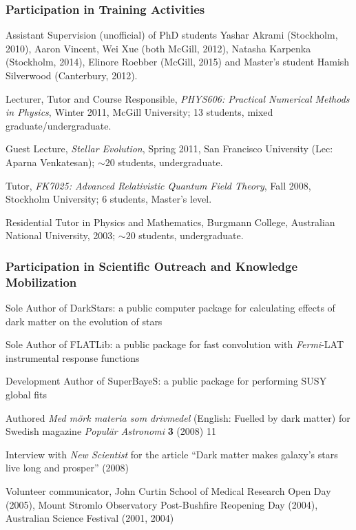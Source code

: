 \documentclass[10pt,oneside,twocolumn,a4paper]{article}
\newenvironment{packed_itemize}{
\begin{itemize}
  \setlength{\itemsep}{1.5pt}
  \setlength{\parskip}{0pt}
  \setlength{\parsep}{0pt}
}{\end{itemize}}
\begin{document}
\subsubsection*{Participation in Training Activities}
\begin{packed_itemize}
\item Assistant Supervision (unofficial) of PhD students Yashar Akrami (Stockholm, 2010), Aaron Vincent, Wei Xue (both McGill, 2012), Natasha Karpenka (Stockholm, 2014), Elinore Roebber (McGill, 2015) and Master's student Hamish Silverwood (Canterbury, 2012). 
\item Lecturer, Tutor and Course Responsible, \textit{PHYS606: Practical Numerical Methods in Physics}, Winter 2011, McGill University; 13 students, mixed graduate/undergraduate.
\item Guest Lecture, \textit{Stellar Evolution}, Spring 2011, San Francisco University (Lec: Aparna Venkatesan); $\sim20$ students, undergraduate.
\item Tutor, \textit{FK7025: Advanced Relativistic Quantum Field Theory}, Fall 2008, Stockholm University; 6 students, Master's level.
\item Residential Tutor in Physics and Mathematics, Burgmann College, Australian National University, 2003; $\sim20$ students, undergraduate.
\end{packed_itemize}

\vspace{-5mm}
\subsubsection*{Participation in Scientific Outreach and Knowledge Mobilization}
\begin{packed_itemize}
\item Sole Author of \textsf{DarkStars}: a public computer package for calculating effects of dark matter on the evolution of stars
\item Sole Author of \textsf{FLATLib}: a public package for fast convolution with \textit{Fermi}-LAT instrumental response functions
\item Development Author of \textsf{SuperBayeS}: a public package for performing SUSY global fits
\item Authored \textit{Med m\"ork materia som drivmedel} (English: Fuelled by dark matter) for Swedish magazine \textit{Popul\"ar Astronomi} \textbf{3} (2008) 11 
\item Interview with \textit{New Scientist} for the article ``Dark matter makes galaxy’s stars live long and prosper'' (2008)
\item Volunteer communicator, John Curtin School of Medical Research Open Day (2005), Mount Stromlo Observatory Post-Bushfire Reopening Day (2004), Australian Science Festival (2001, 2004)
\end{packed_itemize}
\end{document}
